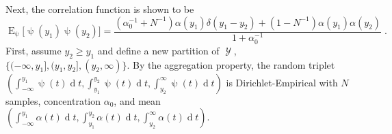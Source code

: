\documentclass[12pt]{report}
\DeclareMathOperator{\Erm}{\mathrm{E}}
\DeclareMathOperator{\drm}{\mathrm{d}}
\DeclareMathOperator{\Ycal}{\mathcal{Y}}
\begin{document}
Next, the correlation function is shown to be 
\begin{equation}
\Erm_{\uppsi}\big[ \uppsi(y_1)\uppsi(y_2) \big] = \frac{(\alpha_0^{-1} + N^{-1}) \alpha(y_1) \delta(y_1-y_2) + (1 - N^{-1}) \alpha(y_1) \alpha(y_2)}{1 + \alpha_0^{-1}} \;.
\end{equation}
First, assume $y_2 \geq y_1$ and define a new partition of $\Ycal$, $\big\{ (-\infty,y_1], (y_1,y_2], (y_2,\infty) \big\}$. By the aggregation property, the random triplet $\left( \int_{-\infty}^{y_1} \uppsi(t) {\drm}t, \int_{y_1}^{y_2} \uppsi(t) {\drm}t, \int_{y_2}^{\infty} \uppsi(t) {\drm}t \right)$ is Dirichlet-Empirical with $N$ samples, concentration $\alpha_0$, and mean $\left( \int_{-\infty}^{y_1} \alpha(t) {\drm}t, \int_{y_1}^{y_2} \alpha(t) {\drm}t, \int_{y_2}^{\infty} \alpha(t) {\drm}t \right)$.
\end{document}
